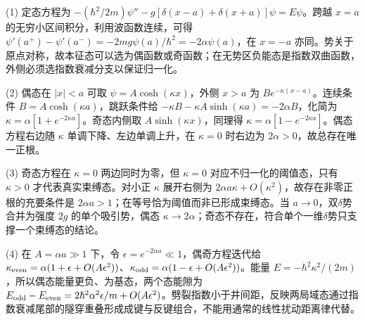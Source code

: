 (1) 定态方程为 \(-(\hbar^2/2m)\psi''-g[\delta(x-a)+\delta(x+a)]\psi=E\psi\)。跨越 \(x=a\) 的无穷小区间积分，利用波函数连续，可得 \(\psi'(a^+)-\psi'(a^-)=-2mg\psi(a)/\hbar^2=-2\alpha\psi(a)\)，在 \(x=-a\) 亦同。势关于原点对称，故本征态可以选为偶函数或奇函数；在无势区负能态是指数双曲函数，外侧必须选指数衰减分支以保证归一化。

(2) 偶态在 \(|x|<a\) 可取 \(\psi=A\cosh(\kappa x)\)，外侧 \(x>a\) 为 \(B e^{-\kappa(x-a)}\)。连续条件 \(B=A\cosh(\kappa a)\)，跳跃条件给 \(-\kappa B-\kappa A\sinh(\kappa a)=-2\alpha B\)，化简为 \(\kappa=\alpha[1+e^{-2\kappa a}]\)。奇态内侧取 \(A\sinh(\kappa x)\)，同理得 \(\kappa=\alpha[1-e^{-2\kappa a}]\)。偶态方程右边随 \(\kappa\) 单调下降、左边单调上升，在 \(\kappa=0\) 时右边为 \(2\alpha>0\)，故总存在唯一正根。

(3) 奇态方程在 \(\kappa=0\) 两边同时为零，但 \(\kappa=0\) 对应不归一化的阈值态，只有 \(\kappa>0\) 才代表真实束缚态。对小正 \(\kappa\) 展开右侧为 \(2\alpha a\kappa+O(\kappa^2)\)，故存在非零正根的充要条件是 \(2\alpha a>1\)；在等号恰为阈值而非已形成束缚态。当 \(a\to0\)，双\(\delta \)势合并为强度 \(2g\) 的单个吸引势，偶态 \(\kappa\to2\alpha\)；奇态不存在，符合单个一维\(\delta \)势只支撑一个束缚态的结论。

(4) 在 \(A=\alpha a\gg1\) 下，令 \(\epsilon=e^{-2\alpha a}\ll1\)，偶奇方程迭代给 \(\kappa_{\rm even}=\alpha(1+\epsilon+O(A\epsilon^2))\)、\(\kappa_{\rm odd}=\alpha(1-\epsilon+O(A\epsilon^2))\)。能量 \(E=-\hbar^2\kappa^2/(2m)\)，所以偶态能量更负、为基态，两个态能隙为 \(E_{\rm odd}-E_{\rm even}=2\hbar^2\alpha^2\epsilon/m+O(A\epsilon^2)\)。劈裂指数小于井间距，反映两局域态通过指数衰减尾部的隧穿重叠形成成键与反键组合，不能用通常的线性扰动距离律代替。
